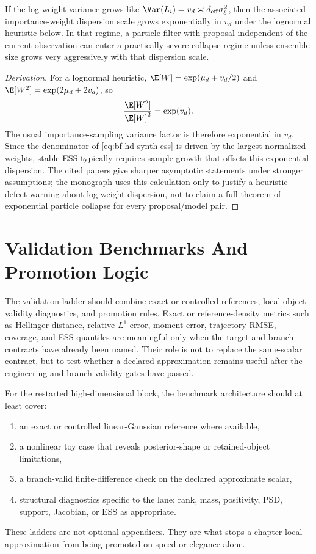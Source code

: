 \begin{proposition}
\label{prop:bf-hd-particle-collapse-calculus}
If the log-weight variance grows like
\(\Var(L_i)=v_d\asymp d_{\mathrm{eff}}\sigma_\ell^2\), then the associated
importance-weight dispersion scale grows exponentially in \(v_d\) under the
lognormal heuristic below.  In that regime, a particle filter with proposal
independent of the current observation can enter a practically severe collapse
regime unless ensemble size grows very aggressively with that dispersion scale.
\end{proposition}

\begin{proof}[Derivation]
For a lognormal heuristic, \(\E[W]=\exp(\mu_d+v_d/2)\) and
\(\E[W^2]=\exp(2\mu_d+2v_d)\), so
\[
  \frac{\E[W^2]}{\E[W]^2}=\exp(v_d).
\]
The usual importance-sampling variance factor is therefore exponential in
\(v_d\).  Since the denominator of \eqref{eq:bf-hd-synth-ess} is driven by the
largest normalized weights, stable ESS typically requires sample growth that
offsets this exponential dispersion.  The cited papers give sharper asymptotic
statements under stronger assumptions; the monograph uses this calculation only
to justify a heuristic defect warning about log-weight dispersion, not to claim a
full theorem of exponential particle collapse for every proposal/model pair.
\end{proof}

\section{Validation Benchmarks And Promotion Logic}
\label{sec:bf-hd-validation-benchmarks}

The validation ladder should combine exact or controlled references, local
object-validity diagnostics, and promotion rules.  Exact or reference-density
metrics such as Hellinger distance, relative \(L^1\) error, moment error,
trajectory RMSE, coverage, and ESS quantiles are meaningful only when the target
and branch contracts have already been named.  Their role is not to replace the
same-scalar contract, but to test whether a declared approximation remains
useful after the engineering and branch-validity gates have passed.

For the restarted high-dimensional block, the benchmark architecture should at
least cover:
\begin{enumerate}[label=(\arabic*), leftmargin=0.28in]
  \item an exact or controlled linear-Gaussian reference where available,
  \item a nonlinear toy case that reveals posterior-shape or retained-object
  limitations,
  \item a branch-valid finite-difference check on the declared approximate scalar,
  \item structural diagnostics specific to the lane: rank, mass, positivity,
  PSD, support, Jacobian, or ESS as appropriate.
\end{enumerate}
These ladders are not optional appendices.  They are what stops a chapter-local
approximation from being promoted on speed or elegance alone.


